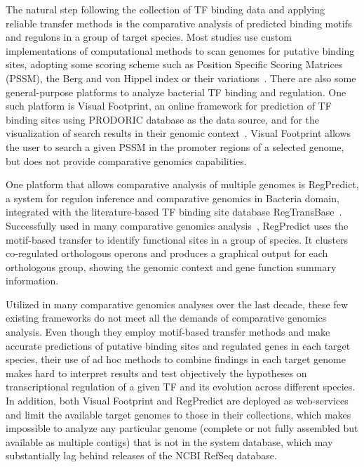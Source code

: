 The natural step following the collection of TF binding data and applying
reliable transfer methods is the comparative analysis of predicted binding
motifs and regulons in a group of target species. Most studies use custom
implementations of computational methods to scan genomes for putative binding
sites, adopting some scoring scheme such as Position Specific Scoring Matrices
(PSSM), the Berg and von Hippel index or their
variations~\citep{schneider1986information, berg1988selection,
  osada2004comparative, beckstette2006fast}. There are also some
general-purpose platforms to analyze bacterial TF binding and regulation. One
such platform is Visual Footprint, an online framework for prediction of TF
binding sites using PRODORIC database as the data source, and for the
visualization of search results in their genomic
context~\citep{munch2005virtual, munch2003prodoric}. Visual Footprint allows the
user to search a given PSSM in the promoter regions of a selected genome, but
does not provide comparative genomics capabilities.

One platform that allows comparative analysis of multiple genomes is
RegPredict, a system for regulon inference and comparative genomics in Bacteria
domain, integrated with the literature-based TF binding site database
RegTransBase~\citep{novichkov2010regpredict,
  kazakov2007regtransbase}. Successfully used in many comparative genomics
analysis~\citep{ravcheev2012transcriptional, antunes2012global,
  novichkov2013regprecise, galperin2014comparative}, RegPredict uses the
motif-based transfer to identify functional sites in a group of species. It
clusters co-regulated orthologous operons and produces a graphical output for
each orthologous group, showing the genomic context and gene function summary
information.

Utilized in many comparative genomics analyses over the last decade, these few
existing frameworks do not meet all the demands of comparative genomics
analysis. Even though they employ motif-based transfer methods and make
accurate predictions of putative binding sites and regulated genes in each
target species, their use of ad hoc methods to combine findings in each target
genome makes hard to interpret results and test objectively the hypotheses on
transcriptional regulation of a given TF and its evolution across different
species. In addition, both Visual Footprint and RegPredict are deployed as
web-services and limit the available target genomes to those in their
collections, which makes impossible to analyze any particular genome
(complete or not fully assembled but available as multiple contigs) that is not
in the system database, which may substantially lag behind releases of the NCBI
RefSeq database.

